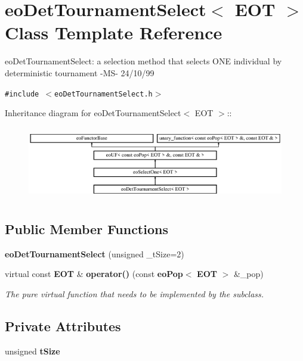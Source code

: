\section{eo\-Det\-Tournament\-Select$<$ EOT $>$ Class Template Reference}
\label{classeo_det_tournament_select}
eo\-Det\-Tournament\-Select: a selection method that selects ONE individual by deterministic tournament -MS- 24/10/99  


{\tt \#include $<$eo\-Det\-Tournament\-Select.h$>$}

Inheritance diagram for eo\-Det\-Tournament\-Select$<$ EOT $>$::\begin{figure}[H]
\begin{center}
\leavevmode
\includegraphics[height=3.23699cm]{classeo_det_tournament_select}
\end{center}
\end{figure}
\subsection*{Public Member Functions}
\begin{CompactItemize}
\item 
{\bf eo\-Det\-Tournament\-Select} (unsigned \_\-t\-Size=2)\label{classeo_det_tournament_select_a0}

\item 
virtual const {\bf EOT} \& {\bf operator()} (const {\bf eo\-Pop}$<$ {\bf EOT} $>$ \&\_\-pop)\label{classeo_det_tournament_select_a1}

\begin{CompactList}\small\item\em The pure virtual function that needs to be implemented by the subclass. \item\end{CompactList}\end{CompactItemize}
\subsection*{Private Attributes}
\begin{CompactItemize}
\item 
unsigned {\bf t\-Size}\label{classeo_det_tournament_select_r0}

\end{CompactItemize}


